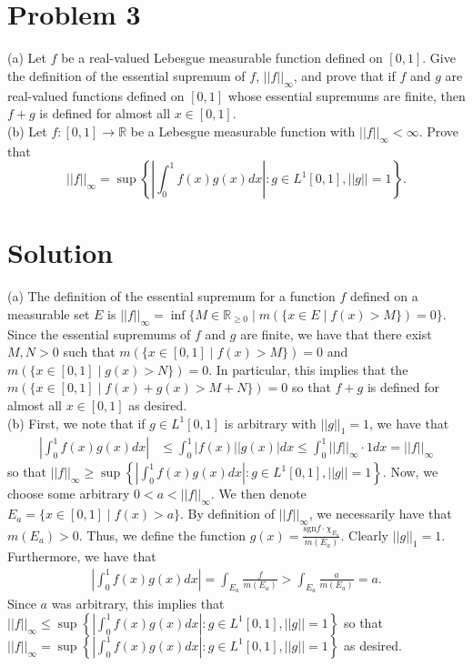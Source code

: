 \documentclass{article}
\begin{document}
\section*{Problem 3}
(a) Let $f$ be a real-valued Lebesgue measurable function defined on $[0,1]$.  Give the definition of the essential supremum of $f$, $||f||_\infty$, and prove that if $f$ and $g$ are real-valued functions defined on $[0,1]$ whose essential supremums are finite, then $f+g$ is defined for almost all $x\in[0,1]$.\\

\noindent (b) Let $f:[0,1]\rightarrow\mathbb{R}$ be a Lebesgue measurable function with $||f||_\infty<\infty$.  Prove that $$||f||_\infty=\sup\left\{\left|\int_0^1f(x)g(x)dx\right|:g\in L^1[0,1],||g||=1\right\}.$$

\section*{Solution}
(a) The definition of the essential supremum for a function $f$ defined on a measurable set $E$ is $||f||_\infty=\inf\{M\in\mathbb{R}_{\geq0}\mid m(\{x\in E\mid f(x)>M\})=0\}$.\\

\noindent Since the essential supremums of $f$ and $g$ are finite, we have that there exist $M,N>0$ such that $m(\{x\in [0,1]\mid f(x)>M\})=0$ and $m(\{x\in [0,1]\mid g(x)>N\})=0$.  In particular, this implies that the $m(\{x\in [0,1]\mid f(x)+g(x)>M+N\})=0$ so that $f+g$ is defined for almost all $x\in[0,1]$ as desired.\\

\noindent (b) First, we note that if $g\in L^1[0,1]$ is arbitrary with $||g||_1=1$, we have that
\begin{align*}
\left|\int_0^1f(x)g(x)dx\right|&\leq\int_0^1|f(x)||g(x)|dx\leq\int_0^1||f||_\infty\cdot 1dx=||f||_\infty
\end{align*}
so that $||f||_\infty\geq\sup\left\{\left|\int_0^1f(x)g(x)dx\right|:g\in L^1[0,1],||g||=1\right\}$.  Now, we choose some arbitrary $0<a<||f||_\infty$.  We then denote $E_a=\{x\in[0,1]\mid f(x)> a\}$.  By definition of $||f||_\infty$, we necessarily have that $m(E_a)>0$.  Thus, we define the function $g(x)=\frac{\mathrm{sgn}f\cdot\chi_{E_a}}{m(E_a)}$.  Clearly $||g||_1=1$.  Furthermore, we have that
\begin{align*}
\left|\int_0^1f(x)g(x)dx\right|=\int_{E_a}\frac{f}{m(E_a)}>\int_{E_a}\frac{a}{m(E_a)}=a.
\end{align*}
Since $a$ was arbitrary, this implies that $||f||_\infty\leq\sup\left\{\left|\int_0^1f(x)g(x)dx\right|:g\in L^1[0,1],||g||=1\right\}$ so that $||f||_\infty=\sup\left\{\left|\int_0^1f(x)g(x)dx\right|:g\in L^1[0,1],||g||=1\right\}$ as desired.
\end{document}
